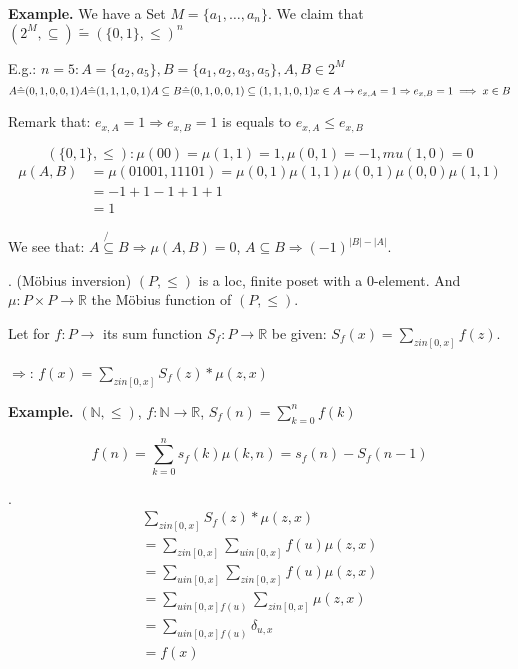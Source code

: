 \textbf{Example.}
We have a Set $M = \{a_1, \ldots , a_n\}$. We claim that $(2^M, \subseteq) \tilde{=} ( \{0,1\}, \leq)^n$

E.g.: $n = 5: A = \{a_2,a_5\}, B= \{a_1, a_2, a_3, a_5\}, A, B \in 2^M$
\[
    A \hat{=} (0,1,0,0,1) \\
    A \hat{=} (1,1,1,0,1) \\
    A \subseteq B \hat{=} (0,1,0,0,1) \subseteq (1,1,1,0,1) \\
    x \in A \rightarrow e_{x,A} = 1 \Rightarrow  e_{x,B} = 1 \implies x \in B\\
\]

Remark that: $e_{x,A} = 1 \Rightarrow  e_{x,B} = 1$ is equals to $e_{x,A} \leq e_{x,B}$ 

\[
    ( \{0,1\}, \leq): \mu(00) = \mu(1,1) = 1, \mu(0,1) = -1, mu(1,0) = 0
\]
\begin{align*}
    \mu(A,B) &= \mu(01001, 11101) = \mu(0,1) \mu(1,1) \mu(0,1) \mu(0,0) \mu(1,1) \\
    &= -1 +1 -1 +1 +1 \\
    &= 1
\end{align*}

We see that: 
$ A\not{\subseteq} B \Rightarrow \mu(A,B) = 0$, 
$A\subseteq B \Rightarrow (-1) ^{|B| - |A|}$. 

\Theorem.
(Möbius inversion)
$(P, \leq)$ is a loc, finite poset with a 0-element. 
And $\mu: P \times P \rightarrow \mathbb{R}$ the Möbius function of $(P, \leq)$. 

Let for $f: P \rightarrow \mathbb{}$ its sum function $S_f: P \rightarrow \mathbb{R}$ be given: $S_f(x) = \sum_{z in [0,x]} f(z)$. 

$\Rightarrow$: $f(x) = \sum_{z in [0,x]} S_f(z) * \mu(z,x)$

\textbf{Example.}
$(\mathbb{N}, \leq)$, $f: \mathbb{N} \rightarrow \mathbb{R}$, $S_f(n) = \sum_{k=0}^{n} f(k)$

\[    
  f(n) = \sum_{k=0}^{n} s_f(k) \mu(k,n) = s_f(n) - S_f(n-1)
\]

\Proof. 
\begin{align*}
    \sum_{z in [0,x]} S_f(z) * \mu(z,x) \\
    = \sum_{z in [0,x]} \sum_{u in [0,x]} f(u) \mu(z,x) \\
    = \sum_{u in [0,x]} \sum_{z in [0,x]} f(u) \mu(z,x) \\
    = \sum_{u in [0,x] f(u)} \sum_{z in [0,x]} \mu(z,x) \\
    = \sum_{u in [0,x] f(u)} \delta_{u,x} \\
    = f(x)
\end{align*}
















